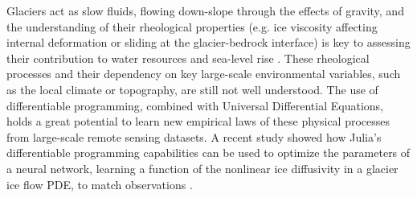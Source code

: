 Glaciers act as slow fluids, flowing down-slope through the effects of gravity, and the understanding of their rheological properties (e.g. ice viscosity affecting internal deformation or sliding at the glacier-bedrock interface) is key to assessing their contribution to water resources and sea-level rise \cite{cuffey_physics_2010}. 
These rheological processes and their dependency on key large-scale environmental variables, such as the local climate or topography, are still not well understood.
The use of differentiable programming, combined with Universal Differential Equations, holds a great potential to learn new empirical laws of these physical processes from large-scale remote sensing datasets. 
A recent study showed how Julia's differentiable programming capabilities can be used to optimize the parameters of a neural network, learning a function of the nonlinear ice diffusivity in a glacier ice flow PDE, to match observations \cite{bolibar_universal_2023}.

